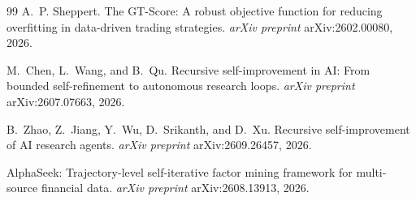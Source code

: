 \documentclass[11pt]{article}
\begin{document}
\begin{thebibliography}{99}
A.~P. Sheppert.
\newblock The GT-Score: A robust objective function for reducing overfitting in data-driven trading
strategies.
\newblock \emph{arXiv preprint} arXiv:2602.00080, 2026.

M.~Chen, L.~Wang, and B.~Qu.
\newblock Recursive self-improvement in AI: From bounded self-refinement to autonomous research
loops.
\newblock \emph{arXiv preprint} arXiv:2607.07663, 2026.

B.~Zhao, Z.~Jiang, Y.~Wu, D.~Srikanth, and D.~Xu.
\newblock Recursive self-improvement of AI research agents.
\newblock \emph{arXiv preprint} arXiv:2609.26457, 2026.

\newblock AlphaSeek: Trajectory-level self-iterative factor mining framework for multi-source
financial data.
\newblock \emph{arXiv preprint} arXiv:2608.13913, 2026.

\end{thebibliography}
\end{document}
